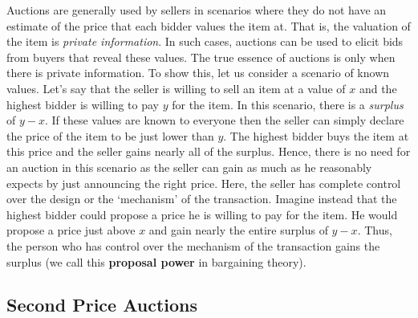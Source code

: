 \documentclass{article}
\theoremstyle{definition}
\begin{document}
Auctions are generally used by sellers in scenarios where they do not have an estimate of the price that each bidder values the item at. That is, the valuation of the item is \textit{private information}. In such cases, auctions can be used to elicit bids from buyers that reveal these values. The true essence of auctions is only when there is private information. To show this, let us consider a scenario of known values. Let's say that the seller is willing to sell an item at a value of $x$ and the highest bidder is willing to pay $y$ for the item. In this scenario, there is a \textit{surplus} of $y-x$. If these values are known to everyone then the seller can simply declare the price of the item to be just lower than $y$. The highest bidder buys the item at this price and the seller gains nearly all of the surplus. Hence, there is no need for an auction in this scenario as the seller can gain as much as he reasonably expects by just announcing the right price. Here, the seller has complete control over the design or the `mechanism' of the transaction. Imagine instead that the highest bidder could propose a price he is willing to pay for the item. He would propose a price just above $x$ and gain nearly the entire surplus of $y-x$. Thus, the person who has control over the mechanism of the transaction gains the surplus (we call this \textbf{proposal power} in bargaining theory).

\subsection{Second Price Auctions}
\end{document}
